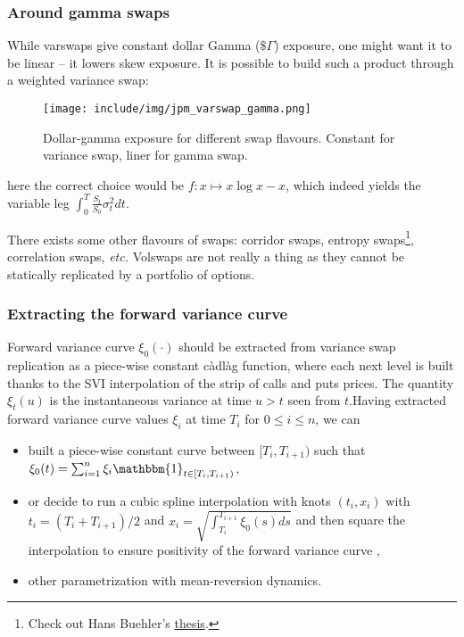 \subsubsection*{Around gamma swaps}

While varswaps give constant dollar Gamma ($\$\Gamma$) exposure, one might want it to be linear -- it lowers skew exposure. It is possible to build such a product through a weighted variance swap:

\begin{figure}[H]
    \texttt{[image: include/img/jpm\_varswap\_gamma.png]}
    \centering
    \caption{Dollar-gamma exposure for different swap flavours. Constant for variance swap, liner for gamma swap.}
    \label{fig:bivariate_contour}
\end{figure}

here the correct choice would be $f: x \mapsto x\log x - x$, which indeed yields the variable leg $\int_{0}^{T} \frac{S_t}{S_0} \sigma_t^2 dt$.

There exists some other flavours of swaps: corridor swaps, entropy swaps\footnote{Check out Hans Buehler's \href{https://papers.ssrn.com/sol3/papers.cfm?abstract_id=1118245}{thesis}.}, correlation swaps, \textit{etc.} Volswaps are not really a thing as they cannot be statically replicated by a portfolio of options.

\subsubsection*{Extracting the forward variance curve}

Forward variance curve $\xi_0(\cdot)$ should be extracted from variance swap replication as a piece-wise constant c\`adl\`ag function, where each next level is built thanks to the SVI interpolation of the strip of calls and puts prices. The quantity $\xi_t(u)$ is the instantaneous variance at time $u > t$ seen from $t$.\newline Having extracted forward variance curve values $\xi_i$ at time $T_i$ for ${0\leq i \leq n}$, we can 
\begin{itemize}
    \item built a piece-wise constant curve between $[T_i, T_{i+1})$ such that $\xi_0(t) = \sum_{i=1}^n \xi_i \mathbbm{1}_{t \in [T_i, T_{i+1})}$, 
    \item or decide to run a cubic spline interpolation with knots $(t_i, x_i)$ with $t_i = (T_i + T_{i+1})/2$ and $x_i = \sqrt{\int_{T_i}^{T_{i+1}} \xi_0(s)ds}$ and then square the interpolation to ensure positivity of the forward variance curve \cite{jaber2022quintic},
    \item other parametrization with mean-reversion dynamics.
\end{itemize}